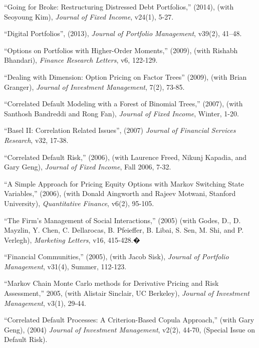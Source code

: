 \documentclass{article}
\begin{document}
\begin{etaremune}
\item ``Going for Broke: Restructuring Distressed Debt Portfolios,'' (2014), (with Seoyoung Kim),  {\it Journal of Fixed Income}, v24(1), 5-27. 

\item ``Digital Portfolios'', (2013), {\it Journal of Portfolio Management}, v39(2), 41--48. 

\item ``Options on Portfolios with Higher-Order Moments,'' (2009), (with Rishabh Bhandari), {\it Finance Research Letters}, v6, 122-129.


\item ``Dealing with Dimension: Option Pricing on Factor Trees'' (2009), (with Brian Granger), 
{\it Journal of Investment Management}, 7(2), 73-85. 

\item ``Correlated Default Modeling with a Forest of Binomial Trees,'' (2007),
(with Santhosh Bandreddi and Rong Fan), {\it Journal of Fixed Income}, Winter, 1-20. 

\item ``Basel II: Correlation Related Issues'', (2007) {\it Journal of Financial Services Research}, v32, 17-38.

\item ``Correlated Default Risk,'' (2006), (with Laurence
Freed, Nikunj Kapadia, and Gary Geng), {\it Journal of Fixed Income},
Fall 2006, 7-32. 


\item ``A Simple Approach for Pricing Equity 
Options with Markov Switching State Variables,'' (2006), (with
Donald Aingworth and Rajeev Motwani, Stanford University), 
{\it Quantitative Finance}, v6(2), 95-105. 

\item ``The Firm's Management of Social Interactions,'' (2005) (with Godes, D., D. Mayzlin, Y. Chen, C. Dellarocas, B. Pfeieffer, B. Libai, S. Sen, M. Shi, and P. Verlegh), {\it Marketing Letters}, v16, 415-428.�

\item ``Financial Communities,'' (2005), (with Jacob Sisk), 
{\it Journal of Portfolio Management}, v31(4), Summer, 112-123.

\item ``Markov Chain Monte Carlo methods for 
Derivative Pricing and Risk Assessment,'' 2005,
(with Alistair Sinclair, UC Berkeley), {\it Journal 
of Investment Management}, v3(1), 29-44.

\item ``Correlated Default Processes: A Criterion-Based Copula Approach,''
(with Gary Geng), (2004) {\it Journal of Investment Management}, v2(2), 44-70, 
(Special Issue on Default Risk).


\end{etaremune}
\end{document}
